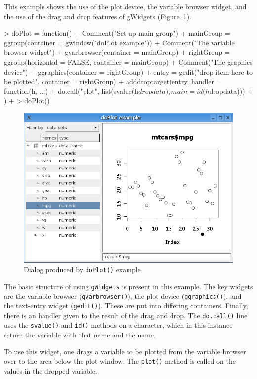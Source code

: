 \documentclass[12pt]{article}
\newcommand{\RCode}[1]{\texttt{#1}}
\newcommand{\RFunc}[1]{\texttt{#1()}}
\begin{document}
This example shows the use of the plot device, the variable browser
widget, and the use of the drag and
drop features of gWidgets (Figure~\ref{fig:doPlot}).



\begin{Schunk}
\begin{Sinput}
> doPlot = function() {
+     Comment("Set up main group")
+     mainGroup = ggroup(container = gwindow("doPlot example"))
+     Comment("The variable browser widget")
+     gvarbrowser(container = mainGroup)
+     rightGroup = ggroup(horizontal = FALSE, container = mainGroup)
+     Comment("The graphics device")
+     ggraphics(container = rightGroup)
+     entry = gedit("drop item here to be plotted", container = rightGroup)
+     adddroptarget(entry, handler = function(h, ...) {
+         do.call("plot", list(svalue(h$dropdata), main = id(h$dropdata)))
+     })
+ }
> doPlot()
\end{Sinput}
\end{Schunk}

\begin{figure}[htbp]
  \centering
  \includegraphics[width=.6\textwidth]{doPlot}
  \caption{Dialog produced by \RFunc{doPlot} example}
  \label{fig:doPlot}
\end{figure}

The basic structure of using \RCode{gWidgets} is present in this
example. The key widgets are the variable browser
(\RFunc{gvarbrowser}), the plot device (\RFunc{ggraphics}), and the
text-entry widget (\RFunc{gedit}). These are put into differing
containers.  Finally, there is an handler given to the result of the
drag and drop. The \RFunc{do.call} line uses the \RFunc{svalue} and
\RFunc{id} methods on a character, which in this instance return the
variable with that name and the name.


To use this widget, one drags a variable to be plotted from the
variable browser over to the area below the plot window. The
\RFunc{plot} method is called on the values in the dropped variable.
\end{document}
